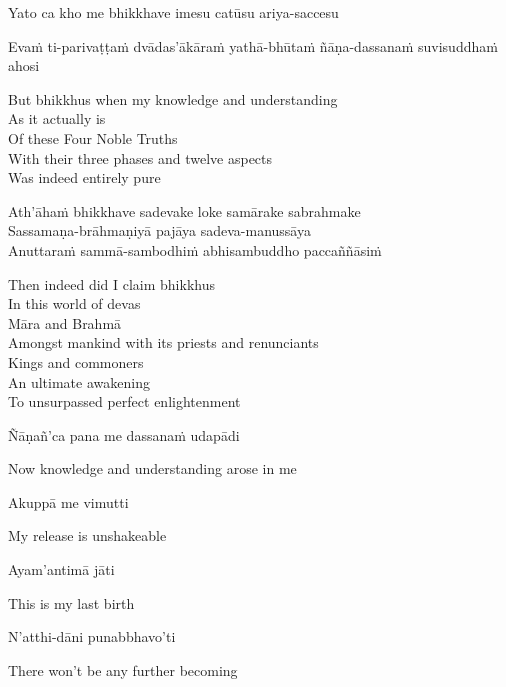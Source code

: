 Yato ca kho me bhikkhave imesu catūsu ariya-saccesu
\begin{pali-hangtogether}
  Evaṁ ti-parivaṭṭaṁ dvādas'ākāraṁ yathā-bhūtaṁ ñāṇa-dassanaṁ suvisuddhaṁ ahosi
\end{pali-hangtogether}

\begin{english-verses}
  But bhikkhus when my knowledge and understanding\\
  As it actually is\\
  Of these Four Noble Truths\\
  With their three phases and twelve aspects\\
  Was indeed entirely pure
\end{english-verses}

Ath'āhaṁ bhikkhave sadevake loke samārake sabrahmake\\
Sassamaṇa-brāhmaṇiyā pajāya sadeva-manussāya\\
Anuttaraṁ sammā-sambodhiṁ abhisambuddho paccaññāsiṁ

\begin{english-verses}
  Then indeed did I claim bhikkhus\\
  In this world of devas\\
  Māra and Brahmā\\
  Amongst mankind with its priests and renunciants\\
  Kings and commoners\\
  An ultimate awakening\\
  To unsurpassed perfect enlightenment
\end{english-verses}

Ñāṇañ'ca pana me dassanaṁ udapādi

\begin{english}
  Now knowledge and understanding arose in me
\end{english}

Akuppā me vimutti

\begin{english}
  My release is unshakeable
\end{english}

Ayam'antimā jāti

\begin{english}
  This is my last birth
\end{english}

N'atthi-dāni punabbhavo'ti

\begin{english}
  There won't be any further becoming
\end{english}

